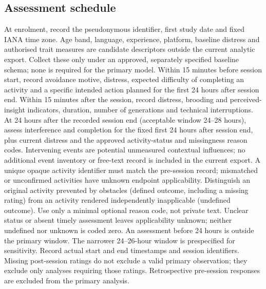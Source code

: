 \documentclass[11pt]{article}
\begin{document}
\subsection{Assessment schedule}
At enrolment, record the pseudonymous identifier, first study date and fixed IANA time zone. Age band, language, experience, platform, baseline distress and authorised trait measures are candidate descriptors outside the current analytic export. Collect these only under an approved, separately specified baseline schema; none is required for the primary model. Within 15 minutes before session start, record avoidance motive, distress, expected difficulty of completing an activity and a specific intended action planned for the first 24 hours after session end. Within 15 minutes after the session, record distress, brooding and perceived-insight indicators, duration, number of generations and technical interruptions. At 24 hours after the recorded session end (acceptable window 24--28 hours), assess interference and completion for the fixed first 24 hours after session end, plus current distress and the approved activity-status and missingness reason codes. Intervening events are potential unmeasured contextual influences; no additional event inventory or free-text record is included in the current export. A unique opaque activity identifier must match the pre-session record; mismatched or unconfirmed activities have unknown endpoint applicability. Distinguish an original activity prevented by obstacles (defined outcome, including a missing rating) from an activity rendered independently inapplicable (undefined outcome). Use only a minimal optional reason code, not private text. Unclear status or absent timely assessment leaves applicability unknown; neither undefined nor unknown is coded zero. An assessment before 24 hours is outside the primary window. The narrower 24--26-hour window is prespecified for sensitivity. Record actual start and end timestamps and session identifiers. Missing post-session ratings do not exclude a valid primary observation; they exclude only analyses requiring those ratings. Retrospective pre-session responses are excluded from the primary analysis.
\end{document}
